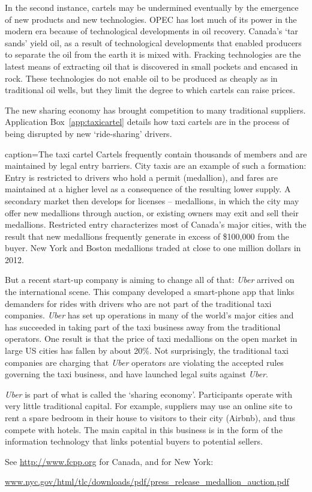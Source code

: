 In the second instance, cartels may be undermined eventually by the
emergence of new products and new technologies. OPEC has lost much of its
power in the modern era because of technological developments in oil
recovery. Canada's `tar sands' yield oil, as a result of technological
developments that enabled producers to separate the oil from the earth it is
mixed with. Fracking technologies are the latest means of extracting oil
that is discovered in small pockets and encased in rock. These technologies
do not enable oil to be produced as cheaply as in traditional oil wells, but
they limit the degree to which cartels can raise prices. 

The new sharing economy has brought competition to many traditional
suppliers. Application Box~\ref{app:taxicartel} details how taxi cartels are 
in the process of being disrupted by new `ride-sharing' drivers.

\newhtmlpage

\begin{ApplicationBox}{caption={The taxi cartel \label{app:taxicartel}}}
	Cartels frequently contain thousands of members and are maintained by legal entry barriers. City taxis are an example of such a formation: Entry is restricted to drivers who hold a permit (medallion), and fares are maintained at a higher level as a consequence of the resulting lower supply. A secondary market then develops for licenses -- medallions, in which the city may offer new medallions through auction, or existing owners may exit and sell their medallions. Restricted entry characterizes most of Canada's major cities, with the result that new medallions frequently generate in excess of \$100,000 from the buyer. New York and Boston medallions traded at close to one million dollars in 2012.

	But a recent start-up company is aiming to change all of that: \textit{Uber} arrived on the international scene. This company developed a smart-phone app that links demanders for rides with drivers who are not part of the traditional taxi companies. \textit{Uber} has set up operations in many of the world's major cities and has succeeded in taking part of the taxi business away from the traditional operators. One result is that the price of taxi medallions on the open market in large US cities has fallen by about 20\%. Not surprisingly, the traditional taxi companies are charging that \textit{Uber} operators are violating the accepted rules governing the taxi business, and have launched legal suits against \textit{Uber}.


	\textit{Uber} is part of what is called the `sharing economy'. Participants operate with very little traditional capital. For example, suppliers may use an online site to rent a spare bedroom in their house to visitors to their city (Airbnb), and thus compete with hotels. The main capital in this business is in the form of the information technology that links potential buyers to potential sellers.

	See \url{http://www.fcpp.org} for Canada, and for New York:

	\href{http://www.nyc.gov/html/tlc/downloads/pdf/press_release_medallion_auction.pdf}{www.nyc.gov/html/tlc/downloads/pdf/press\_release\_medallion\_auction.pdf}
\end{ApplicationBox}
